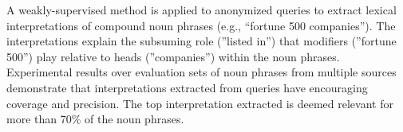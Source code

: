 A weakly-supervised method is applied to anonymized queries to extract lexical interpretations of compound noun phrases (e.g., ``fortune 500 companies''). The interpretations explain the subsuming role (''listed in'') that modifiers (''fortune 500'') play relative to heads (''companies'') within the noun phrases. Experimental results over evaluation sets of noun phrases from multiple sources demonstrate that interpretations extracted from queries have encouraging coverage and precision. The top interpretation extracted is deemed relevant for more than 70\% of the noun phrases.
